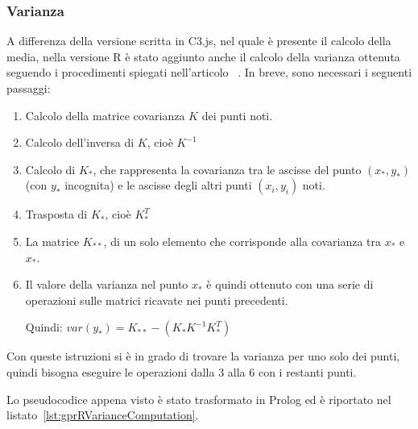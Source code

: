 \documentclass[10pt,titlepage,twoside,a4paper]{report}
\begin{document}
\subsubsection{Varianza}
A differenza della versione scritta in C3.js, nel quale è presente il 
calcolo della media, nella versione R è stato aggiunto 
anche il calcolo della varianza ottenuta seguendo i procedimenti spiegati 
nell'articolo ~\cite{gpr}. In breve, sono necessari i seguenti 
passaggi:

\begin{enumerate}
\item Calcolo della matrice covarianza $K$ dei punti noti.

\item Calcolo dell'inversa di $K$, cioè $K^{-1}$

\item Calcolo di $K_{\ast}$, che rappresenta la covarianza tra
le ascisse del punto $(x_{\ast},y_{\ast})$ (con $y_{\ast}$ incognita) e le 
ascisse degli altri punti $(x_{i},y_{i})$ noti.

\item Trasposta di $K_{\ast}$, cioè $K_{\ast}^T$

\item La matrice $K_{\ast\ast}$, di un solo elemento che 
corrisponde alla covarianza tra $x_{\ast}$ e $x_{\ast}$.

\item Il valore della varianza nel punto $x_{\ast}$ è quindi ottenuto 
con una serie di operazioni sulle matrici ricavate nei punti precedenti. 

Quindi: $var(y_{\ast}) = K_{\ast\ast} - (K_{\ast} K^{-1} K_{\ast}^T)$
\end{enumerate}

Con queste istruzioni si è in grado di trovare la varianza per uno 
solo dei punti, quindi bisogna eseguire le operazioni dalla 3 
alla 6 con i restanti punti.

Lo pseudocodice appena visto è stato trasformato in Prolog ed è riportato nel 
listato~\ref{lst:gprRVarianceComputation}.
\end{document}
